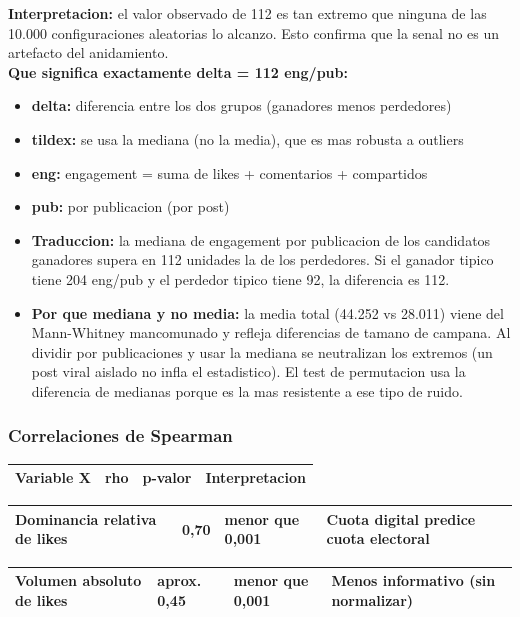 \documentclass[11pt,a4paper]{article}
\begin{document}
\textbf{Interpretacion:} el valor observado de 112 es tan extremo que ninguna de las 10.000 configuraciones aleatorias lo alcanzo. Esto confirma que la senal no es un artefacto del anidamiento.\\[2pt]

\textbf{Que significa exactamente delta = 112 eng/pub:}\\[2pt]
\begin{itemize}[noitemsep,topsep=2pt]
\item \textbf{delta:} diferencia entre los dos grupos (ganadores menos perdedores)
\item \textbf{tilde{x}:} se usa la mediana (no la media), que es mas robusta a outliers
\item \textbf{eng:} engagement = suma de likes + comentarios + compartidos
\item \textbf{pub:} por publicacion (por post)
\item \textbf{Traduccion:} la mediana de engagement por publicacion de los candidatos ganadores supera en 112 unidades la de los perdedores. Si el ganador tipico tiene 204 eng/pub y el perdedor tipico tiene 92, la diferencia es 112.
\item \textbf{Por que mediana y no media:} la media total (44.252 vs 28.011) viene del Mann-Whitney mancomunado y refleja diferencias de tamano de campana. Al dividir por publicaciones y usar la mediana se neutralizan los extremos (un post viral aislado no infla el estadistico). El test de permutacion usa la diferencia de medianas porque es la mas resistente a ese tipo de ruido.
\end{itemize}

\subsubsection{Correlaciones de Spearman}

\begin{center}
\begin{tabular}{llll}
\hline
Variable X & rho & p-valor & Interpretacion \\
\hline
\end{tabular}
\end{center}
\begin{center}
\begin{tabular}{llll}
\hline
Dominancia relativa de likes & 0,70 & menor que 0,001 & Cuota digital predice cuota electoral \\
\hline
\end{tabular}
\end{center}
\begin{center}
\begin{tabular}{llll}
\hline
Volumen absoluto de likes & aprox. 0,45 & menor que 0,001 & Menos informativo (sin normalizar) \\
\hline
\end{tabular}
\end{center}
\end{document}
